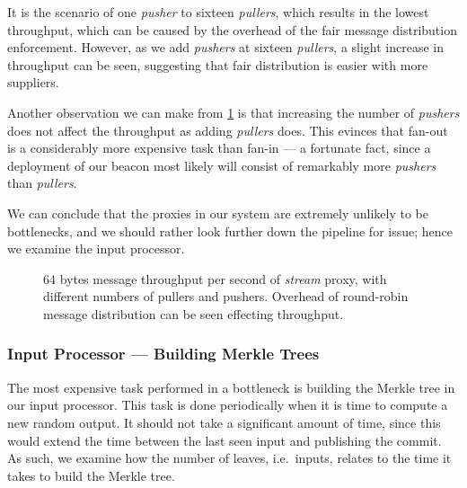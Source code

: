 It is the scenario of one \textit{pusher} to sixteen \textit{pullers}, which results in the lowest throughput, which can be caused by the overhead of the fair message distribution enforcement.
However, as we add \textit{pushers} at sixteen \textit{pullers}, a slight increase in throughput can be seen, suggesting that fair distribution is easier with more suppliers.

Another observation we can make from \cref{fig:proxy_throughput} is that increasing the number of \textit{pushers} does not affect the throughput as adding \textit{pullers} does.
This evinces that fan-out is a considerably more expensive task than fan-in --- a fortunate fact, since a deployment of our beacon most likely will consist of remarkably more \textit{pushers} than \textit{pullers}.

We can conclude that the proxies in our system are extremely unlikely to be bottlenecks, and we should rather look further down the pipeline for issue; hence we examine the input processor.

\begin{figure}
    \centering
    \footnotesize
    \caption{%
        64 bytes message throughput per second of \textit{stream} proxy, with different numbers of pullers and pushers.
Overhead of round-robin message distribution can be seen effecting throughput.}%
    \label{fig:proxy_throughput}
\end{figure}

\subsubsection{Input Processor --- Building Merkle Trees}%
\label{ssub:input_processor_building_merkle_trees}
The most expensive task performed in a bottleneck is building the Merkle tree in our input processor.
This task is done periodically when it is time to compute a new random output.
It should not take a significant amount of time, since this would extend the time between the last seen input and publishing the commit.
As such, we examine how the number of leaves, i.e.\ inputs, relates to the time it takes to build the Merkle tree.

